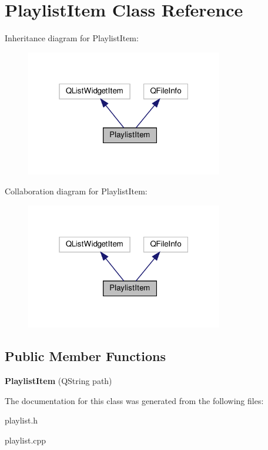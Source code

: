 \hypertarget{classPlaylistItem}{}\section{Playlist\+Item Class Reference}
\label{classPlaylistItem}


Inheritance diagram for Playlist\+Item\+:\nopagebreak
\begin{figure}[H]
\begin{center}
\leavevmode
\includegraphics[width=244pt]{classPlaylistItem__inherit__graph}
\end{center}
\end{figure}


Collaboration diagram for Playlist\+Item\+:\nopagebreak
\begin{figure}[H]
\begin{center}
\leavevmode
\includegraphics[width=244pt]{classPlaylistItem__coll__graph}
\end{center}
\end{figure}
\subsection*{Public Member Functions}
\begin{DoxyCompactItemize}
\item 
\mbox{\label{classPlaylistItem_ab7983fead6752aa8795868c8f4f3ce32}} 
{\bfseries Playlist\+Item} (Q\+String path)
\end{DoxyCompactItemize}


The documentation for this class was generated from the following files\+:\begin{DoxyCompactItemize}
\item 
playlist.\+h\item 
playlist.\+cpp\end{DoxyCompactItemize}
